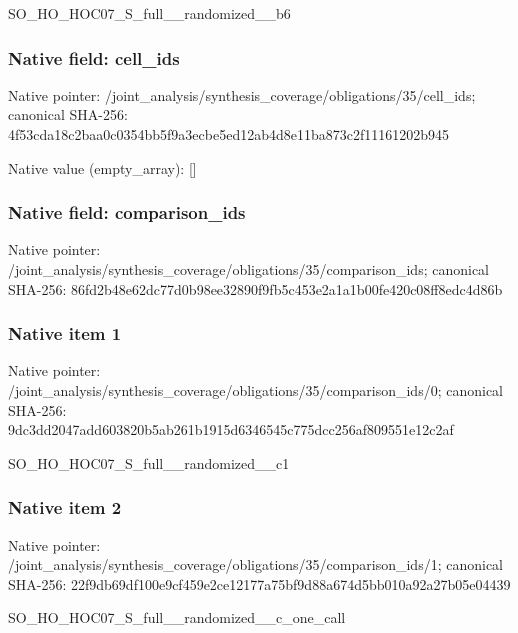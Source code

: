 \documentclass[10pt,a4paper]{article}
\begin{document}
\begingroup\raggedright\sloppy SO\_\allowbreak{}HO\_\allowbreak{}HOC07\_\allowbreak{}S\_\allowbreak{}full\_\allowbreak{}\_\allowbreak{}randomized\_\allowbreak{}\_\allowbreak{}b6\par\endgroup

\subsubsection{Native field: cell\_\allowbreak{}ids}
Native pointer: /joint\_\allowbreak{}analysis/synthesis\_\allowbreak{}coverage/obligations/35/cell\_\allowbreak{}ids; canonical SHA-256: 4f53cda18c2baa0c0354bb5f9a3ecbe5ed12ab4d8e11ba873c2f11161202b945

Native value (empty\_\allowbreak{}array): []

\subsubsection{Native field: comparison\_\allowbreak{}ids}
Native pointer: /joint\_\allowbreak{}analysis/synthesis\_\allowbreak{}coverage/obligations/35/comparison\_\allowbreak{}ids; canonical SHA-256: 86fd2b48e62dc77d0b98ee32890f9fb5c453e2a1a1b00fe420c08ff8edc4d86b

\subsubsection{Native item 1}
Native pointer: /joint\_\allowbreak{}analysis/synthesis\_\allowbreak{}coverage/obligations/35/comparison\_\allowbreak{}ids/0; canonical SHA-256: 9dc3dd2047add603820b5ab261b1915d6346545c775dcc256af809551e12c2af

\begingroup\raggedright\sloppy SO\_\allowbreak{}HO\_\allowbreak{}HOC07\_\allowbreak{}S\_\allowbreak{}full\_\allowbreak{}\_\allowbreak{}randomized\_\allowbreak{}\_\allowbreak{}c1\par\endgroup

\subsubsection{Native item 2}
Native pointer: /joint\_\allowbreak{}analysis/synthesis\_\allowbreak{}coverage/obligations/35/comparison\_\allowbreak{}ids/1; canonical SHA-256: 22f9db69df100e9cf459e2ce12177a75bf9d88a674d5bb010a92a27b05e04439

\begingroup\raggedright\sloppy SO\_\allowbreak{}HO\_\allowbreak{}HOC07\_\allowbreak{}S\_\allowbreak{}full\_\allowbreak{}\_\allowbreak{}randomized\_\allowbreak{}\_\allowbreak{}c\_\allowbreak{}one\_\allowbreak{}call\par\endgroup
\end{document}
